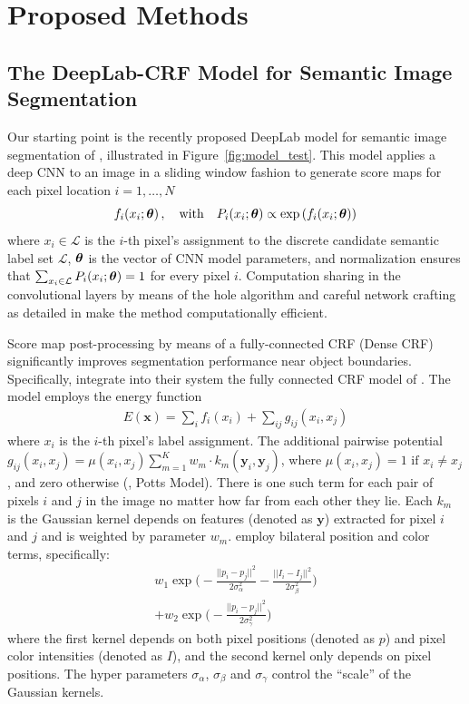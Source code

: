 \section{Proposed Methods}
\label{sec:methods}

\subsection{The DeepLab-CRF Model for Semantic Image Segmentation}

Our starting point is the recently proposed DeepLab model for semantic
image segmentation of \citet{chen2014semantic}, illustrated in
Figure~\ref{fig:model_test}. This model applies a deep CNN to an image
in a sliding window fashion to generate score maps for each pixel
location $i = 1, \dots, N$
\begin{equation}
  \label{eq:scores}
  f_i(x_i; \boldsymbol{\theta}) \,,
  \quad \mathrm{with} \quad
  P_i(x_i; \boldsymbol{\theta}) \propto \exp \left( f_i(x_i; \boldsymbol{\theta}) \right)
\end{equation}
where $x_i \in \mathcal{L}$ is the $i$-th pixel's assignment to the
discrete candidate semantic label set $\mathcal{L}$, $\boldsymbol{\theta}$ is the
vector of CNN model parameters, and normalization ensures that
$\sum_{x_i \in  \mathcal{L}} P_i(x_i; \boldsymbol{\theta}) = 1$ for every pixel
$i$. Computation sharing in the convolutional layers by means of the
hole algorithm and careful network crafting as detailed in
\citet{chen2014semantic} make the method computationally efficient.

Score map post-processing by means of a fully-connected CRF (Dense CRF)
\cite{krahenbuhl2011efficient} significantly improves segmentation
performance near object boundaries. Specifically,
\citet{chen2014semantic} integrate into their system the fully
connected CRF model of \citet{krahenbuhl2011efficient}.
The model employs the energy function
\begin{align}
  E(\boldsymbol{x}) = \sum_i f_i(x_i) + \sum_{ij} g_{ij}(x_i, x_j)
\end{align}
where $x_i$ is the $i$-th pixel's label assignment. The
additional pairwise potential $g_{ij}(x_i, x_j) =
\mu(x_i,x_j)\sum_{m=1}^{K} w_m \cdot k_m(\boldsymbol{y}_i,
\boldsymbol{y}_j)$, where $\mu(x_i,x_j)=1 \text{ if } x_i \neq x_j$,
and zero otherwise (\ie, Potts Model). There is one such term for
each pair of pixels $i$ and $j$ in the image no matter how far from
each other they lie. Each $k_m$ is the Gaussian kernel depends on features
(denoted as $\boldsymbol{y}$) extracted for pixel $i$ and $j$ and is
weighted by parameter $w_m$. \citet{chen2014semantic} employ bilateral
position and color terms, specifically:
\begin{multline}
  \label{eq:fully_crf}
  w_1 \exp \Big(-\frac{||p_i-p_j||^2}{2\sigma_\alpha^2}
  -\frac{||I_i-I_j||^2}{2\sigma_\beta^2} \Big)\\
  + w_2 \exp \Big(-\frac{||p_i-p_j||^2}{2\sigma_\gamma^2}\Big)
\end{multline}
where the first kernel depends on both pixel positions (denoted as $p$) and
pixel color intensities (denoted as $I$), and the second kernel only depends
on pixel positions. The hyper parameters $\sigma_\alpha$, $\sigma_\beta$ and
$\sigma_\gamma$ control the ``scale'' of the Gaussian kernels.

